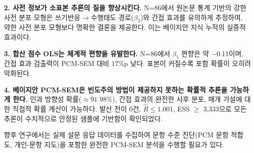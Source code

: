 \documentclass[a4paper,10pt]{oblivoir}
\begin{document}
\textbf{2. 사전 정보가 소표본 추론의 질을 향상시킨다.} N=86에서 원논문 통계 기반의 강한 사전 분포 모형은 쓰기반응\ensuremath{\rightarrow}수행태도 경로($\beta_2$)와 간접 효과를 유의하게 추정하여, 약한 사전 분포 모형보다 명확한 결론을 제공한다. 이는 베이지안 지식 누적의 실증적 효과이다.

\textbf{3. 합산 점수 OLS는 체계적 편향을 유발한다.} N=86에서 $\beta_1$ 편향은 약 \ensuremath{-}0.11이며, 간접 효과 검출력이 PCM-SEM 대비 17\%p 낮다. 표본이 커질수록 포함 확률이 오히려 악화된다.

\textbf{4. 베이지안 PCM-SEM은 빈도주의 방법이 제공하지 못하는 확률적 추론을 가능하게 한다.} 인과 방향성 확률($\approx 91\text{~}98\%$), 간접 효과의 완전한 사후 분포, 매개 가설에 대한 직접적 확률 계산이 가능하다. 발산 전이 0건, $\hat{R} \leq 1.001$, ESS \ensuremath{\geq} 3,333으로 모든 추론이 수치적으로 안정된 샘플에 기반함이 확인되었다.

향후 연구에서는 실제 설문 응답 데이터를 수집하여 문항 수준 진단(PCM 문항 적합도, 개인-문항 지도)을 포함한 완전한 PCM-SEM 분석을 수행할 필요가 있다.
\end{document}
